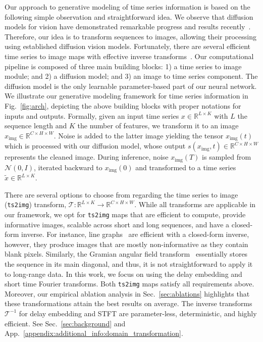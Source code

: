 \documentclass{article}
\newcommand{\code}[1]{\texttt{#1}}
\begin{document}
Our approach to generative modeling of time series information is based on the following simple observation and straightforward idea. We observe that diffusion models for vision have demonstrated remarkable progress and results recently~\cite{ho2020denoising, rombach2022high, ramesh2022hierarchical}. Therefore, our idea is to transform sequences to images, allowing their processing using established diffusion vision models. Fortunately, there are several efficient time series to image maps with effective inverse transforms~\cite{takens2006detecting, griffin1984signal, wang2015imaging, li2024time}. Our computational pipeline is composed of three main building blocks: 1) a time series to image module; and 2) a diffusion model; and 3) an image to time series component. The diffusion model is the only learnable parameter-based part of our neural network. We illustrate our generative modeling framework for time series information in Fig.~\ref{fig:arch}, depicting the above building blocks with proper notations for inputs and outputs. Formally, given an input time series $x \in \mathbb{R}^{L \times K}$ with $L$ the sequence length and $K$ the number of features, we transform it to an image $x_\text{img} \in \mathbb{R}^{C \times H \times W}$. Noise is added to the latter image yielding the tensor $x_\text{img}(t)$ which is processed with our diffusion model, whose output $s(x_\text{img}, t) \in \mathbb{R}^{C \times H \times W}$ represents the cleaned image. During inference, noise $x_\text{img}(T)$ is sampled from $\mathcal{N}(0, I)$, iterated backward to $x_\text{img}(0)$ and transformed to a time series $\tilde{x} \in \mathbb{R}^{L \times K}$.

There are several options to choose from regarding the time series to image (\code{ts2img}) transform, $\mathcal{T} : \mathbb{R}^{L \times K} \rightarrow \mathbb{R}^{C \times H \times W}$. While all transforms are applicable in our framework, we opt for \code{ts2img} maps that are efficient to compute, provide informative images, scalable across short and long sequences, and have a closed-form inverse. For instance, line graphs~\cite{li2024time} are efficient with a closed-form inverse, however, they produce images that are mostly non-informative as they contain blank pixels. Similarly, the Gramian angular field transform~\cite{wang2015imaging} essentially stores the sequence in its main diagonal, and thus, it is not straightforward to apply it to long-range data. In this work, we focus on using the delay embedding and short time Fourier transforms. Both \code{ts2img} maps satisfy all requirements above. Moreover, our empirical ablation analysis in Sec.~\ref{sec:ablations} highlights that these transformations attain the best results on average. The inverse transforms $\mathcal{T}^{-1}$ for delay embedding and STFT are parameter-less, deterministic, and highly efficient. See Sec.~\ref{sec:background} and App.~\ref{appendix:additional_info:domain_transformation}.
\end{document}
